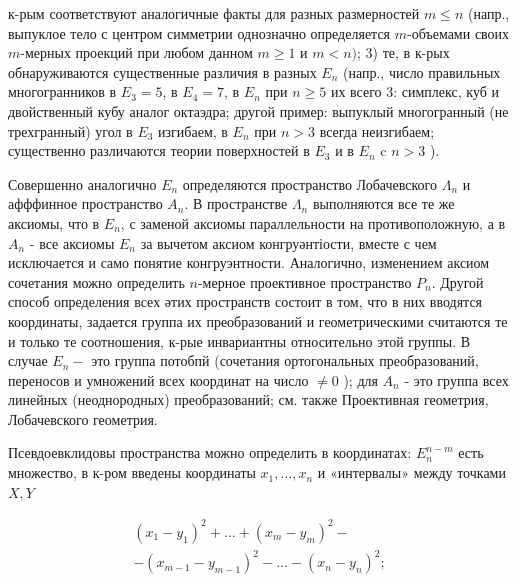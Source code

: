 \documentclass[10pt]{article}
\begin{document}
к-рым соответствуют аналогичные факты для разных размерностей $m \leqslant n$ (напр., выпуклое тело с центром симметрии однозначно определяется $m$-объемами своих $m$-мерных проекций при любом данном $m \geqslant 1$ и $m<n)$; 3) те, в к-рых обнаруживаются существенные различия в разных $E_{n}$ (напр., число правильных многогранников в $E_{3}=5$, в $E_{4}=7$, в $E_{n}$ при $n \geqslant 5$ их всего 3: симплекс, куб и двойственный кубу аналог октаэдра; другой пример: выпуклый многогранный (не трехгранный) угол в $E_{3}$ изгибаем, в $E_{n}$ при $n>3$ всегда неизгибаем; существенно различаются теории поверхностей в $E_{3}$ и в $E_{n}$ c $n>3$ ).



Совершенно аналогично $E_{n}$ определяются пространство Лобачевского $\Lambda_{n}$ и афффинное пространство $A_{n}$. В пространстве $\Lambda_{n}$ выполняются все те же аксиомы, что в $E_{n}$, с заменой аксиомы параллельности на противоположную, а в $A_{n}$ - все аксиомы $E_{n}$ за вычетом аксиом конгруәнтіости, вместе с чем исключается и само понятие конгруэнтности. Аналогично, изменением аксиом сочетания можно определить $n$-мерное проективное пространство $P_{n}$. Другой способ определения всех әтих пространств состоит в том, что в них вводятся координаты, задается группа их преобразований и геометрическими считаются те и только те соотношения, к-рые инвариантны относительно этой группы. В случае $E_{n}-$ это группа потобпй (сочетания ортогональных преобразований, переносов и умножений всех координат на число $\neq 0$ ); для $A_{n}$ - это группа всех линейных (неоднородных) преобразований; см. также Проективная геометрия, Лобачевского геометрия.



Псевдоевклидовы пространства можно определить в координатах: $E_{n}^{n-m}$ есть множество, в к-ром введены координаты $x_{1}, \ldots, x_{n}$ и «интервалы» между точками $X, Y$



\[

\begin{gathered}

\left(x_{1}-y_{1}\right)^{2}+\ldots+\left(x_{m}-y_{m}\right)^{2}- \\

-\left(x_{m-1}-y_{m-1}\right)^{2}-\ldots-\left(x_{n}-y_{n}\right)^{2} ;

\end{gathered}

\]
\end{document}
